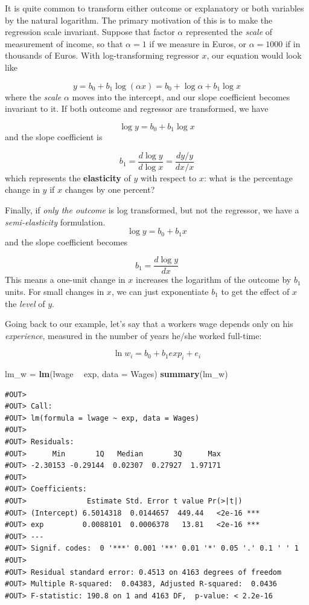 \documentclass[]{book}
\newenvironment{Shaded}{\begin{snugshade}}{\end{snugshade}}
\newcommand{\KeywordTok}[1]{\textcolor[rgb]{0.13,0.29,0.53}{\textbf{#1}}}
\newcommand{\DataTypeTok}[1]{\textcolor[rgb]{0.13,0.29,0.53}{#1}}
\newcommand{\StringTok}[1]{\textcolor[rgb]{0.31,0.60,0.02}{#1}}
\newcommand{\OperatorTok}[1]{\textcolor[rgb]{0.81,0.36,0.00}{\textbf{#1}}}
\newcommand{\NormalTok}[1]{#1}
\theoremstyle{definition}
\theoremstyle{definition}
\theoremstyle{definition}
\theoremstyle{remark}
\begin{document}
It is quite common to transform either outcome or explanatory or both
variables by the natural logarithm. The primary motivation of this is to
make the regression scale invariant. Suppose that factor \(\alpha\)
represented the \emph{scale} of measurement of income, so that
\(\alpha=1\) if we measure in Euros, or \(\alpha=1000\) if in thousands
of Euros. With log-transforming regressor \(x\), our equation would look
like

\[
y = b_0 + b_1 \log(\alpha x) = b_0 + \log \alpha  + b_1 \log x 
\] where the \emph{scale} \(\alpha\) moves into the intercept, and our
slope coefficient becomes invariant to it. If both outcome and regressor
are transformed, we have

\[
\log y = b_0 + b_1 \log x
\] and the slope coefficient is

\[
b_1 = \frac{d\log y}{d \log x} = \frac{dy/y}{dx/x}
\] which represents the \textbf{elasticity} of \(y\) with respect to
\(x\): what is the percentage change in \(y\) if \(x\) changes by one
percent?

Finally, if \emph{only the outcome} is log transformed, but not the
regressor, we have a \emph{semi-elasticity} formulation. \[
\log y = b_0 + b_1 x
\] and the slope coefficient becomes

\[
b_1 = \frac{d\log y}{d x}
\] This means a one-unit change in \(x\) increases the logarithm of the
outcome by \(b_1\) units. For small changes in \(x\), we can just
exponentiate \(b_1\) to get the effect of \(x\) the \emph{level} of
\(y\).

Going back to our example, let's say that a workers wage depends only on
his \emph{experience}, measured in the number of years he/she worked
full-time:

\[
\ln w_i = b_0 + b_1 exp_i + e_i \label{eq:wage-exp}
\]

\begin{Shaded}
\begin{Highlighting}[]
\NormalTok{lm_w =}\StringTok{ }\KeywordTok{lm}\NormalTok{(lwage }\OperatorTok{~}\StringTok{ }\NormalTok{exp, }\DataTypeTok{data =}\NormalTok{ Wages)}
\KeywordTok{summary}\NormalTok{(lm_w)}
\end{Highlighting}
\end{Shaded}

\begin{verbatim}
#OUT> 
#OUT> Call:
#OUT> lm(formula = lwage ~ exp, data = Wages)
#OUT> 
#OUT> Residuals:
#OUT>      Min       1Q   Median       3Q      Max 
#OUT> -2.30153 -0.29144  0.02307  0.27927  1.97171 
#OUT> 
#OUT> Coefficients:
#OUT>              Estimate Std. Error t value Pr(>|t|)    
#OUT> (Intercept) 6.5014318  0.0144657  449.44   <2e-16 ***
#OUT> exp         0.0088101  0.0006378   13.81   <2e-16 ***
#OUT> ---
#OUT> Signif. codes:  0 '***' 0.001 '**' 0.01 '*' 0.05 '.' 0.1 ' ' 1
#OUT> 
#OUT> Residual standard error: 0.4513 on 4163 degrees of freedom
#OUT> Multiple R-squared:  0.04383, Adjusted R-squared:  0.0436 
#OUT> F-statistic: 190.8 on 1 and 4163 DF,  p-value: < 2.2e-16
\end{verbatim}
\end{document}
